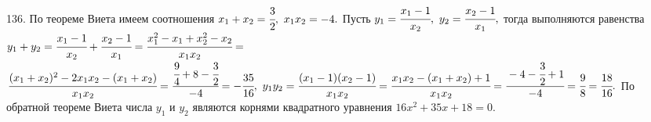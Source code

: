 136. По теореме Виета имеем соотношения $x_1+x_2=\cfrac{3}{2},\ x_1x_2=-4.$ Пусть $y_1=\cfrac{x_1-1}{x_2},\ y_2=\cfrac{x_2-1}{x_1},$ тогда выполняются равенства
$y_1+y_2=\cfrac{x_1-1}{x_2}+\cfrac{x_2-1}{x_1}=\cfrac{x_1^2-x_1+x_2^2-x_2}{x_1x_2}=$\\$\cfrac{(x_1+x_2)^2-2x_1x_2-(x_1+x_2)}{x_1x_2}=
\cfrac{\cfrac{9}{4}+8-\cfrac{3}{2}}{-4}=-\cfrac{35}{16},\ y_1y_2=\cfrac{(x_1-1)(x_2-1)}{x_1x_2}=\cfrac{x_1x_2-(x_1+x_2)+1}{x_1x_2}=
\cfrac{-4-\cfrac{3}{2}+1}{-4}=\cfrac{9}{8}=\cfrac{18}{16}.$ По обратной теореме Виета числа $y_1$ и $y_2$ являются корнями квадратного уравнения $16x^2+35x+18=0.$\\
